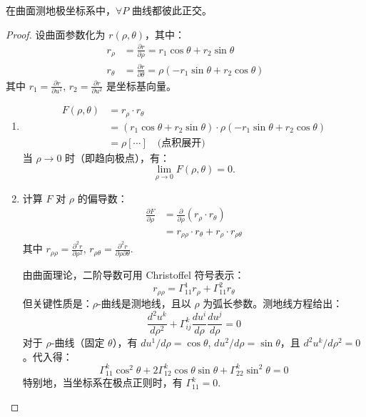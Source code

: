 \documentclass[lang=cn,10pt,thmcnt=section]{elegantbook}
\begin{document}
\begin{lemma}[Gauss 引理]
    在曲面测地极坐标系中，\(\forall P\) 曲线都彼此正交。
\end{lemma}
\begin{proof}
    设曲面参数化为 \( r(\rho, \theta) \)，其中：
\begin{align*}
r_\rho &= \frac{\partial r}{\partial \rho} = r_1 \cos \theta + r_2 \sin \theta \\
r_\theta &= \frac{\partial r}{\partial \theta} = \rho (-r_1 \sin \theta + r_2 \cos \theta)
\end{align*}
其中 \( r_1 = \frac{\partial r}{\partial u^1} \), \( r_2 = \frac{\partial r}{\partial u^2} \) 是坐标基向量。

\begin{enumerate}
    \item \begin{align*}
        F(\rho, \theta) &= r_\rho \cdot r_\theta \\
        &= (r_1 \cos \theta + r_2 \sin \theta) \cdot \rho (-r_1 \sin \theta + r_2 \cos \theta) \\
        &= \rho \left[ \cdots \right] \quad \text{(点积展开)}
        \end{align*}
        当 \(\rho \to 0\) 时（即趋向极点），有：
        \[
        \lim_{\rho \to 0} F(\rho, \theta) = 0.
        \]
    
    \item 计算 \( F \) 对 \(\rho\) 的偏导数：
    \begin{align*}
    \frac{\partial F}{\partial \rho} &= \frac{\partial}{\partial \rho} (r_\rho \cdot r_\theta) \\
    &= r_{\rho\rho} \cdot r_\theta + r_\rho \cdot r_{\rho\theta}
    \end{align*}
    其中 \( r_{\rho\rho} = \frac{\partial^2 r}{\partial \rho^2} \), \( r_{\rho\theta} = \frac{\partial^2 r}{\partial \rho \partial \theta} \).
    
    由曲面理论，二阶导数可用 Christoffel 符号表示：
    \[
    r_{\rho\rho} = \Gamma_{11}^1 r_\rho + \Gamma_{11}^2 r_\theta
    \]
    但关键性质是：\(\rho\)-曲线是测地线，且以 \(\rho\) 为弧长参数。测地线方程给出：
    \[
    \frac{d^2 u^k}{d\rho^2} + \Gamma_{ij}^k \frac{du^i}{d\rho} \frac{du^j}{d\rho} = 0
    \]
    对于 \(\rho\)-曲线（固定 \(\theta\)），有 \( du^1/d\rho = \cos \theta \), \( du^2/d\rho = \sin \theta \)，且 \( d^2 u^k/d\rho^2 = 0 \)。代入得：
    \[
    \Gamma_{11}^k \cos^2 \theta + 2\Gamma_{12}^k \cos\theta \sin\theta + \Gamma_{22}^k \sin^2 \theta = 0
    \]
    特别地，当坐标系在极点正则时，有 \(\Gamma_{11}^k = 0\).
    

\end{enumerate}
\end{proof}
\end{document}
